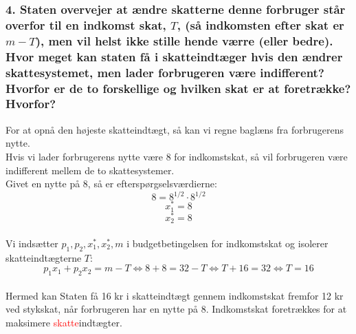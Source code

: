 \documentclass[a4paper, 12pt]{article}
\begin{document}
\subsubsection*{4. Staten overvejer at ændre skatterne denne forbruger står overfor til en indkomst skat, $T$, (så indkomsten efter skat er $m-T$), men vil helst ikke stille hende værre (eller bedre). Hvor meget kan staten få i skatteindtæger hvis den ændrer skattesystemet, men lader forbrugeren være indifferent? Hvorfor er de to forskellige og hvilken skat er at foretrække? Hvorfor?}
For at opnå den højeste skatteindtægt, så kan vi regne baglæns fra forbrugerens nytte.\\
Hvis vi lader forbrugerens nytte være 8 for indkomstskat, så vil forbrugeren være indifferent mellem de to skattesystemer.\\
Givet en nytte på 8, så er efterspørgselsværdierne:
$$ 8 = 8^{1/2}\cdot 8^{1/2}$$
$$x_{1}^{*} = 8 $$
$$x_{2}^{*} = 8 $$
\\
Vi indsætter $p_{1},p_{2},x_{1}^{*}, x_{2}^{*}, m$ i budgetbetingelsen for indkomstskat og isolerer skatteindtægterne $T$:
$$p_{1}x_{1} + p_{2}x_{2} = m - T \Leftrightarrow 8 + 8 = 32 - T \Leftrightarrow T+16=32 \Leftrightarrow T = 16$$
\\
Hermed kan Staten få 16 kr i skatteindtægt gennem indkomstskat fremfor 12 kr ved stykskat, når forbrugeren har en nytte på 8.  Indkomstskat foretrækkes for at maksimere  \textcolor{red}{skatte}indtægter.



\end{document}
